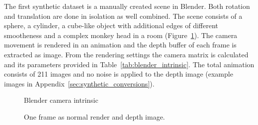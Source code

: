 The first synthetic dataset is a manually created scene in Blender\cite{blender}.
Both rotation and translation are done in isolation as well combined.
The scene consists of a sphere, a cylinder, a cube-like object with additional edges of different smootheness and a complex monkey head in a room (Figure~\ref{fig:blender_scene}).
The camera movement is rendered in an animation and the depth buffer of each frame is extracted as image.
From the rendering settings the camera matrix is calculated and its parameters provided in Table~\ref{tab:blender_intrinsic}.
The total animation consists of 211 images and no noise is applied to the depth image (example images in Appendix~\ref{sec:synthetic_conversions}).
\begin{figure}[H]
\CenterFloatBoxes%
\begin{floatrow}
    {\caption{Blender camera intrinsic}\label{tab:blender_intrinsic}}%
    {\caption{One frame as normal render and depth image.}\label{fig:blender_scene}}
\end{floatrow}
\end{figure}


